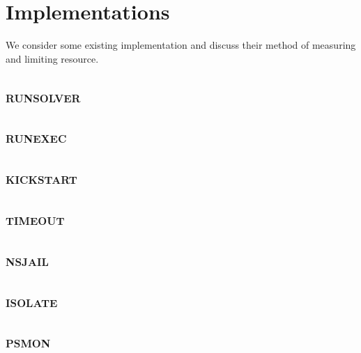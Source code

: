 \section{Implementations}

We consider some existing implementation and discuss their method of measuring and limiting resource.

\subsection{\textsc{runsolver}}

\subsection{\textsc{runexec}}

\subsection{\textsc{kickstart}}

\subsection{\textsc{timeout}}

\subsection{\textsc{nsjail}}
\label{sec:resource.impl.nsjail}

\subsection{\textsc{isolate}}

\subsection{\textsc{psmon}}